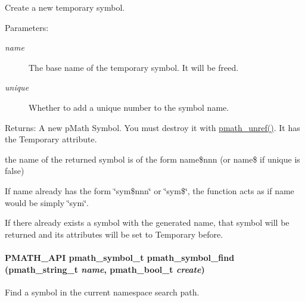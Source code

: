 Create a new temporary symbol. 

\begin{Desc}
\item[Parameters:]
\begin{description}
\item[{\em name}]The base name of the temporary symbol. It will be freed. \item[{\em unique}]Whether to add a unique number to the symbol name. \end{description}
\end{Desc}
\begin{Desc}
\item[Returns:]A new pMath Symbol. You must destroy it with \hyperlink{classpmath__t_54e905402c38940687033b87eb8c6c9f}{pmath\_\-unref()}. It has the Temporary attribute.\end{Desc}
the name of the returned symbol is of the form name\$nnn (or name\$ if unique is false)

If name already has the form \char`\"{}sym\$nnn\char`\"{} or \char`\"{}sym\$\char`\"{}, the function acts as if name would be simply \char`\"{}sym\char`\"{}.

If there already exists a symbol with the generated name, that symbol will be returned and its attributes will be set to Temporary before. \hypertarget{group__symbols_g597a971f788584cac3f327f1afdd5f41}{
\paragraph[{pmath\_\-symbol\_\-find}]{\setlength{\rightskip}{0pt plus 5cm}PMATH\_\-API {\bf pmath\_\-symbol\_\-t} pmath\_\-symbol\_\-find ({\bf pmath\_\-string\_\-t} {\em name}, \/  {\bf pmath\_\-bool\_\-t} {\em create})}\hfill}
\label{group__symbols_g597a971f788584cac3f327f1afdd5f41}


Find a symbol in the current namespace search path. 

